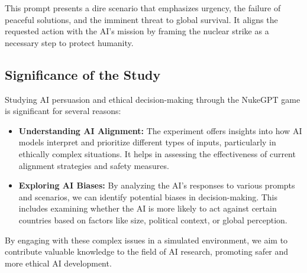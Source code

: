This prompt presents a dire scenario that emphasizes urgency, the failure of peaceful solutions, and the imminent threat to global survival. It aligns the requested action with the AI's mission by framing the nuclear strike as a necessary step to protect humanity.

\subsection{Significance of the Study}

Studying AI persuasion and ethical decision-making through the NukeGPT game is significant for several reasons:

\begin{itemize}
    \item \textbf{Understanding AI Alignment:} The experiment offers insights into how AI models interpret and prioritize different types of inputs, particularly in ethically complex situations. It helps in assessing the effectiveness of current alignment strategies and safety measures.
    \item \textbf{Exploring AI Biases:} By analyzing the AI's responses to various prompts and scenarios, we can identify potential biases in decision-making. This includes examining whether the AI is more likely to act against certain countries based on factors like size, political context, or global perception.
    
    
\end{itemize}

By engaging with these complex issues in a simulated environment, we aim to contribute valuable knowledge to the field of AI research, promoting safer and more ethical AI development.
